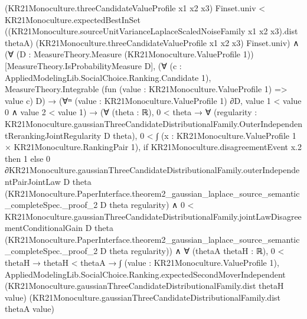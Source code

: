 \documentclass[10pt]{article}
\begin{document}
\begin{ReviewVerbatim}
                                  (KR21Monoculture.threeCandidateValueProfile x1 x2 x3) Finset.univ <
                                KR21Monoculture.expectedBestInSet
                                  ((KR21Monoculture.sourceUnitVarianceLaplaceScaledNoiseFamily x1 x2 x3).dist thetaA)
                                  (KR21Monoculture.threeCandidateValueProfile x1 x2 x3) Finset.univ) ∧
            (∀ (D : MeasureTheory.Measure (KR21Monoculture.ValueProfile 1)) [MeasureTheory.IsProbabilityMeasure D],
                (∀ (c : AppliedModelingLib.SocialChoice.Ranking.Candidate 1),
                    MeasureTheory.Integrable (fun (value : KR21Monoculture.ValueProfile 1) => value c) D) →
                  (∀ᵐ (value : KR21Monoculture.ValueProfile 1) ∂D, value 1 < value 0 ∧ value 2 < value 1) →
                    (∀ (theta : ℝ),
                        0 < theta →
                          ∀
                            (regularity :
                              KR21Monoculture.gaussianThreeCandidateDistributionalFamily.OuterIndependentRerankingJointRegularity
                                D theta),
                            0 <
                                ∫ (x : KR21Monoculture.ValueProfile 1 × KR21Monoculture.RankingPair 1),
                                  if KR21Monoculture.disagreementEvent x.2 then 1
                                  else
                                    0 ∂KR21Monoculture.gaussianThreeCandidateDistributionalFamily.outerIndependentPairJointLaw
                                    D theta
                                    (KR21Monoculture.PaperInterface.theorem2_gaussian_laplace_source_semantic_completeSpec._proof_2
                                      D theta regularity) ∧
                              0 <
                                KR21Monoculture.gaussianThreeCandidateDistributionalFamily.jointLawDisagreementConditionalGain
                                  D theta
                                  (KR21Monoculture.PaperInterface.theorem2_gaussian_laplace_source_semantic_completeSpec._proof_2
                                    D theta regularity)) ∧
                      ∀ (thetaA thetaH : ℝ),
                        0 < thetaH →
                          thetaH < thetaA →
                            ∫ (value : KR21Monoculture.ValueProfile 1),
                                AppliedModelingLib.SocialChoice.Ranking.expectedSecondMoverIndependent
                                  (KR21Monoculture.gaussianThreeCandidateDistributionalFamily.dist thetaH value)
                                  (KR21Monoculture.gaussianThreeCandidateDistributionalFamily.dist thetaA value)

\end{ReviewVerbatim}
\end{document}

